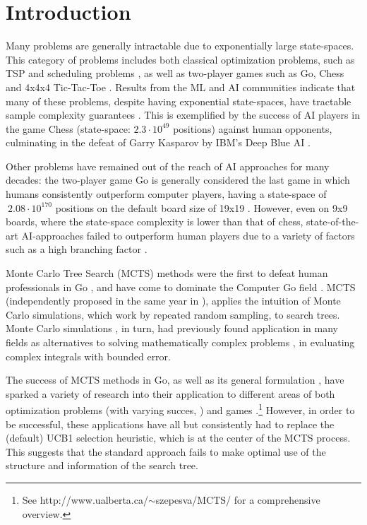 \section{Introduction}
Many problems are generally intractable due to exponentially large state-spaces. This category of problems includes both classical optimization problems, such as TSP and scheduling problems \cite{browne2012survey}, as well as two-player games such as Go, Chess and 4x4x4 Tic-Tac-Toe \cite{chaslot2010monte, sharma2008knowledge}.
Results from the ML and AI communities indicate that many of these problems, despite having exponential state-spaces, have tractable sample complexity guarantees \cite{sharma2008knowledge}. This is exemplified by the success of AI players in the game Chess (state-space: $2.3 \cdot 10^{49}$ positions) against human opponents, culminating in the defeat of Garry Kasparov by IBM's Deep Blue AI \cite{campbell2002deep}.

Other problems have remained out of the reach of AI approaches for many decades: the two-player game Go is generally considered the last game in which humans consistently outperform computer players, having a state-space of $~2.08 \cdot 10^{170}$ positions on the default board size of 19x19 \cite{tromp2007combinatorics}. However, even on 9x9 boards, where the state-space complexity is lower than that of chess, state-of-the-art AI-approaches failed to outperform human players due to a variety of factors such as a high branching factor \cite{browne2012survey}.

Monte Carlo Tree Search (MCTS) methods were the first to defeat human professionals in Go \cite{coulom2007efficient}, and have come to dominate the Computer Go field \cite{chaslot2010monte}. MCTS (independently proposed in the same year in \cite{coulom2007efficient, kocsis2006bandit, chaslot2006monte}), applies the intuition of Monte Carlo simulations, which work by repeated random sampling, to search trees. Monte Carlo simulations \cite{metropolis1985monte}, in turn, had previously found application in many fields as alternatives to solving mathematically complex problems \cite{liu2008monte}, \eg in evaluating complex integrals with bounded error.

The success of MCTS methods in Go, as well as its general formulation \cite{chaslot2010monte}, have sparked a variety of research into their application to different areas of both optimization problems (with varying succes, \eg \cite{rimmel2011optimization, cazenave2009monte}) and games \cite{schadd2008single, gelly2012grand}.\footnote{See http://www.ualberta.ca/$\sim$szepesva/MCTS/ for a comprehensive overview.} However, in order to be successful, these applications have all but consistently had to replace the (default) UCB1 selection heuristic, which is at the center of the MCTS process. This suggests that the standard approach fails to make optimal use of the structure and information of the search tree.

